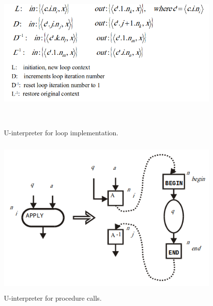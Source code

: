 \documentclass[UTF8,12pt,a4paper]{article}
\begin{document}
\begin{figure}[htb]
  \begin{small}
    \begin{center}
      \includegraphics[width=\textwidth,height=8cm]{figures/dynamic_dataflow_interpreter.png}
    \end{center}
    \caption{U-interpreter for loop implementation.}
    \label{fig:dynamic_dataflow_interpreter}
  \end{small}
\end{figure}

\begin{figure}[htb]
  \begin{small}
    \begin{center}
      \includegraphics[width=\textwidth,height=8cm]{figures/dynamic_dataflow_interpreter_call.png}
    \end{center}
    \caption{U-interpreter for procedure calls.}
    \label{fig:dynamic_dataflow_interpreter_call}
  \end{small}
\end{figure}
\end{document}
